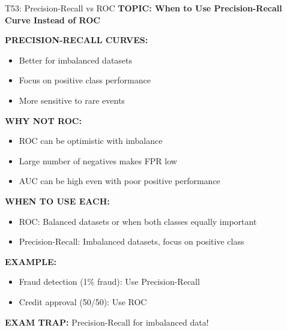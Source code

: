 \documentclass[8pt]{beamer}
\begin{document}
	\begin{frame}{T53: Precision-Recall vs ROC}
		\fontsize{6.5}{7.5}\selectfont
		\textbf{TOPIC: When to Use Precision-Recall Curve Instead of ROC}
		
		\vspace{0.1cm}
		\textbf{PRECISION-RECALL CURVES:}
		\begin{itemize}
			\item Better for imbalanced datasets
			\item Focus on positive class performance
			\item More sensitive to rare events
		\end{itemize}
		
		\vspace{0.1cm}
		\textbf{WHY NOT ROC:}
		\begin{itemize}
			\item ROC can be optimistic with imbalance
			\item Large number of negatives makes FPR low
			\item AUC can be high even with poor positive performance
		\end{itemize}
		
		\vspace{0.1cm}
		\textbf{WHEN TO USE EACH:}
		\begin{itemize}
			\item \textcolor{myblue}{ROC:} Balanced datasets or when both classes equally important
			\item \textcolor{myblue}{Precision-Recall:} Imbalanced datasets, focus on positive class
		\end{itemize}
		
		\vspace{0.1cm}
		\textbf{EXAMPLE:}
		\begin{itemize}
			\item Fraud detection (1\% fraud): Use Precision-Recall
			\item Credit approval (50/50): Use ROC
		\end{itemize}
		
		\textcolor{myred}{\textbf{EXAM TRAP:}} Precision-Recall for \textcolor{myblue}{imbalanced data}!
	\end{frame}
	
\end{document}
